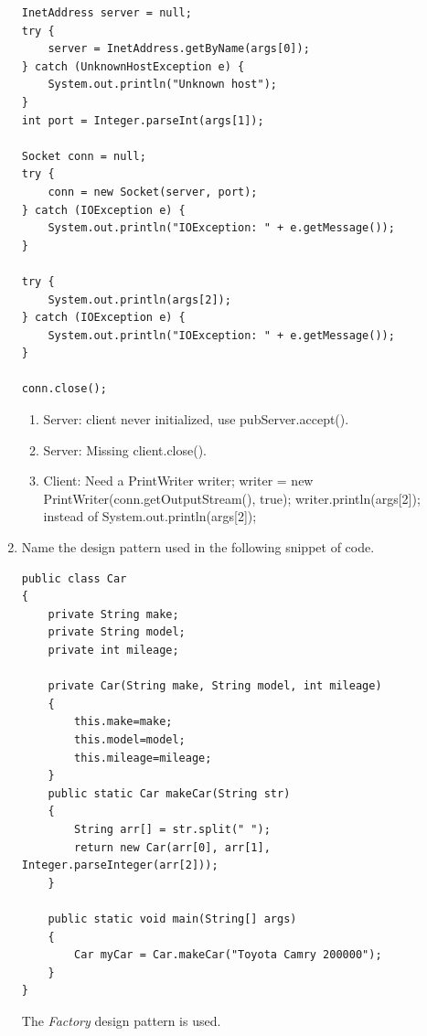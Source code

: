 \documentclass[11pt]{article}
\newenvironment{answer}{\large\lstset{basicstyle=\tiny\ttfamily}\color{white}}{}
\newenvironment{answer}{\large\lstset{basicstyle=\large\ttfamily}\color{red}}{}
\begin{document}
\begin{enumerate}
	\begin{lstlisting}
InetAddress server = null;
try {
	server = InetAddress.getByName(args[0]);
} catch (UnknownHostException e) {
	System.out.println("Unknown host");
}
int port = Integer.parseInt(args[1]);

Socket conn = null;
try {
	conn = new Socket(server, port);
} catch (IOException e) {
	System.out.println("IOException: " + e.getMessage());
}

try {
	System.out.println(args[2]);
} catch (IOException e) {
	System.out.println("IOException: " + e.getMessage());
}

conn.close();
	\end{lstlisting}

	\begin{answer}
		\begin{enumerate}
		\item
			Server: client never initialized, use pubServer.accept().
		\item
			Server: Missing client.close().
		\item
			Client: Need a PrintWriter writer; writer = new PrintWriter(conn.getOutputStream(), true); writer.println(args[2]); instead of System.out.println(args[2]);
		\end{enumerate}
	\end{answer}

\item Name the design pattern used in the following snippet of code.
\begin{lstlisting}
public class Car
{
	private String make;
	private String model;
	private int mileage;

	private Car(String make, String model, int mileage)
	{
		this.make=make;
		this.model=model;
		this.mileage=mileage;
	}
	public static Car makeCar(String str)
	{
		String arr[] = str.split(" ");
		return new Car(arr[0], arr[1], Integer.parseInteger(arr[2]));
	}

	public static void main(String[] args)
	{
		Car myCar = Car.makeCar("Toyota Camry 200000");
	}
}
\end{lstlisting}

\begin{answer}
The \emph{Factory} design pattern is used.
\vspace{.5in}
\end{answer}
\end{enumerate}
\end{document}

